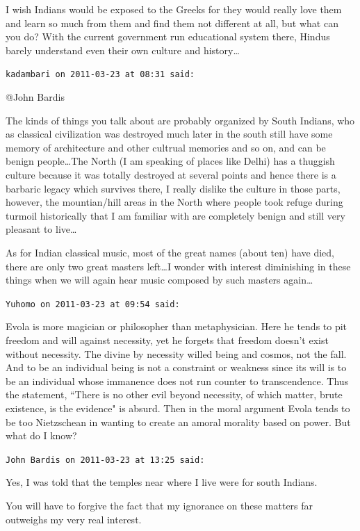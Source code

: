 \begin{footnotesize}
\begin{sffamily}
I wish Indians would be exposed to the Greeks for they would really love them and learn so much from them and find them not different at all, but what can you do? With the current government run educational system there, Hindus barely understand even their own culture and history…


\hfill

\texttt{kadambari on 2011-03-23 at 08:31 said: }

@John Bardis

The kinds of things you talk about are probably organized by South Indians, who as classical civilization was destroyed much later in the south still have some memory of architecture and other cultrual memories and so on, and can be benign people…The North (I am speaking of places like Delhi) has a thuggish culture because it was totally destroyed at several points and hence there is a barbaric legacy which survives there, I really dislike the culture in those parts, however, the mountian/hill areas in the North where people took refuge during turmoil historically that I am familiar with are completely benign and still very pleasant to live…

As for Indian classical music, most of the great names (about ten) have died, there are only two great masters left…I wonder with interest diminishing in these things when we will again hear music composed by such masters again…


\hfill

\texttt{Yuhomo on 2011-03-23 at 09:54 said: }

Evola is more magician or philosopher than metaphysician. Here he tends to pit freedom and will against necessity, yet he forgets that freedom doesn't exist without necessity. The divine by necessity willed being and cosmos, not the fall. And to be an individual being is not a constraint or weakness since its will is to be an individual whose immanence does not run counter to transcendence. Thus the statement, ``There is no other evil beyond necessity, of which matter, brute existence, is the evidence" is absurd. Then in the moral argument Evola tends to be too Nietzschean in wanting to create an amoral morality based on power. But what do I know?


\hfill

\texttt{John Bardis on 2011-03-23 at 13:25 said: }

Yes, I was told that the temples near where I live were for south Indians.

You will have to forgive the fact that my ignorance on these matters far outweighs my very real interest.


\end{sffamily}
\end{footnotesize}
